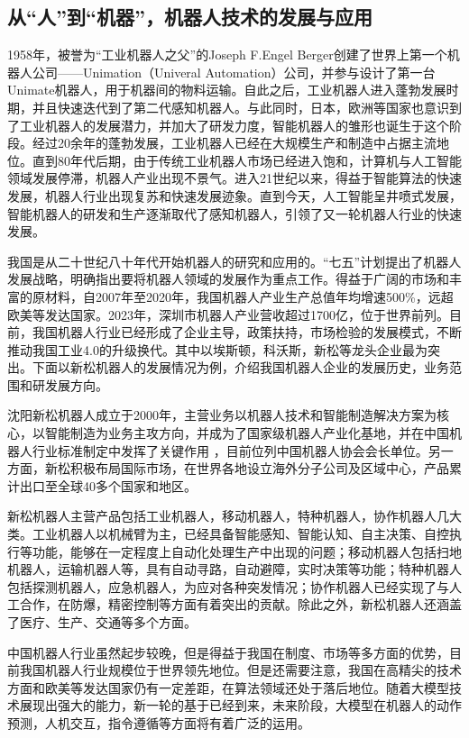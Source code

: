 \subsection{从“人”到“机器”，机器人技术的发展与应用}

1958年，被誉为“工业机器人之父”的Joseph F.Engel Berger创建了世界上第一个机器人公司——Unimation（Univeral Automation）公司，并参与设计了第一台Unimate机器人，用于机器间的物料运输。自此之后，工业机器人进入蓬勃发展时期，并且快速迭代到了第二代感知机器人。与此同时，日本，欧洲等国家也意识到了工业机器人的发展潜力，并加大了研发力度，智能机器人的雏形也诞生于这个阶段。经过20余年的蓬勃发展，工业机器人已经在大规模生产和制造中占据主流地位。直到80年代后期，由于传统工业机器人市场已经进入饱和，计算机与人工智能领域发展停滞，机器人产业出现不景气。进入21世纪以来，得益于智能算法的快速发展，机器人行业出现复苏和快速发展迹象。直到今天，人工智能呈井喷式发展，智能机器人的研发和生产逐渐取代了感知机器人，引领了又一轮机器人行业的快速发展。

我国是从二十世纪八十年代开始机器人的研究和应用的。“七五”计划提出了机器人发展战略，明确指出要将机器人领域的发展作为重点工作。得益于广阔的市场和丰富的原材料，自2007年至2020年，我国机器人产业生产总值年均增速500\%，远超欧美等发达国家。2023年，深圳市机器人产业营收超过1700亿，位于世界前列。目前，我国机器人行业已经形成了企业主导，政策扶持，市场检验的发展模式，不断推动我国工业4.0的升级换代。其中以埃斯顿，科沃斯，新松等龙头企业最为突出。下面以新松机器人的发展情况为例，介绍我国机器人企业的发展历史，业务范围和研发展方向。

沈阳新松机器人成立于2000年，主营业务以机器人技术和智能制造解决方案为核心，以智能制造为业务主攻方向，并成为了国家级机器人产业化基地，并在中国机器人行业标准制定中发挥了关键作用 ，目前位列中国机器人协会会长单位。另一方面，新松积极布局国际市场，在世界各地设立海外分子公司及区域中心，产品累计出口至全球40多个国家和地区。

新松机器人主营产品包括工业机器人，移动机器人，特种机器人，协作机器人几大类。工业机器人以机械臂为主，已经具备智能感知、智能认知、自主决策、自控执行等功能，能够在一定程度上自动化处理生产中出现的问题；移动机器人包括扫地机器人，运输机器人等，具有自动寻路，自动避障，实时决策等功能；特种机器人包括探测机器人，应急机器人，为应对各种突发情况；协作机器人已经实现了与人工合作，在防爆，精密控制等方面有着突出的贡献。除此之外，新松机器人还涵盖了医疗、生产、交通等多个方面。

中国机器人行业虽然起步较晚，但是得益于我国在制度、市场等多方面的优势，目前我国机器人行业规模位于世界领先地位。但是还需要注意，我国在高精尖的技术方面和欧美等发达国家仍有一定差距，在算法领域还处于落后地位。随着大模型技术展现出强大的能力，新一轮的基于已经到来，未来阶段，大模型在机器人的动作预测，人机交互，指令遵循等方面将有着广泛的运用。

